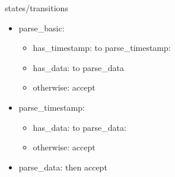 \begin{frame}[fragile]{states/transitions}
\begin{itemize}
\item parse\_basic:
    \begin{itemize}
    \item has\_timestamp: to parse\_timestamp:
    \item has\_data: to parse\_data
    \item otherwise: accept
    \end{itemize}
\item parse\_timestamp:
    \begin{itemize}
    \item has\_data: to parse\_data:
    \item otherwise: accept
    \end{itemize}
\item parse\_data: then accept
\end{itemize}
\end{frame}
